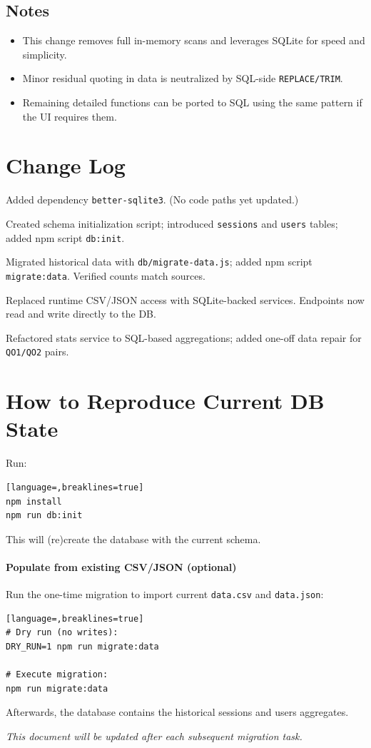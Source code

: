 \documentclass[11pt,a4paper]{article}
\begin{document}
\subsection{Notes}
\begin{itemize}[noitemsep]
  \item This change removes full in-memory scans and leverages SQLite for speed and simplicity.
  \item Minor residual quoting in data is neutralized by SQL-side \texttt{REPLACE/TRIM}.
  \item Remaining detailed functions can be ported to SQL using the same pattern if the UI requires them.
\end{itemize}

\section{Change Log}
\begin{description}[leftmargin=1.2cm,style=nextline]
  \item[Step 1] Added dependency \texttt{better-sqlite3}. (No code paths yet updated.)
  \item[Step 2] Created schema initialization script; introduced \texttt{sessions} and \texttt{users} tables; added npm script \texttt{db:init}.
  \item[Step 3] Migrated historical data with \texttt{db/migrate-data.js}; added npm script \texttt{migrate:data}. Verified counts match sources.
  \item[Step 4] Replaced runtime CSV/JSON access with SQLite-backed services. Endpoints now read and write directly to the DB.
  \item[Step 5] Refactored stats service to SQL-based aggregations; added one-off data repair for \texttt{QO1/QO2} pairs.
\end{description}

\section{How to Reproduce Current DB State}
Run:
\begin{lstlisting}[language=,breaklines=true]
npm install
npm run db:init
\end{lstlisting}
This will (re)create the database with the current schema.

\paragraph{Populate from existing CSV/JSON (optional)}
Run the one-time migration to import current \texttt{data.csv} and \texttt{data.json}:
\begin{lstlisting}[language=,breaklines=true]
# Dry run (no writes):
DRY_RUN=1 npm run migrate:data

# Execute migration:
npm run migrate:data
\end{lstlisting}
Afterwards, the database contains the historical sessions and users aggregates.

\vfill
\begin{center}\textit{This document will be updated after each subsequent migration task.}\end{center}
\end{document}
